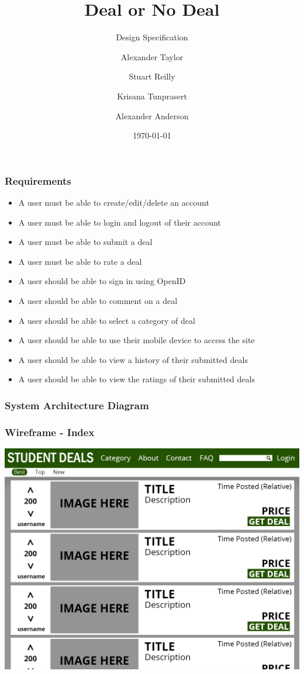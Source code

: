 \documentclass{beamer}
\title{Deal or No Deal}
\subtitle{Design Specification}
\author{Alexander Taylor \and Stuart Reilly \and Krisana Tunprasert \and Alexander Anderson}
\date{\today}
\begin{document}
\frame{\titlepage}

\begin{frame}
	\frametitle{Requirements}
	\begin{itemize}
		\item A user must be able to create/edit/delete an account
		\item A user must be able to login and logout of their account
		\item A user must be able to submit a deal
		\item A user must be able to rate a deal
		\item A user should be able to sign in using OpenID
		\item A user should be able to comment on a deal
		\item A user should be able to select a category of deal
		\item A user should be able to use their mobile device to access the site
		\item A user should be able to view a history of their submitted deals
		\item A user should be able to view the ratings of their submitted deals
	\end{itemize}
\end{frame}

\begin{frame}
	\frametitle{System Architecture Diagram}
	\resizebox{\textwidth}{!}{}
\end{frame}

\begin{frame}
	\frametitle{Wireframe - Index}
	\includegraphics[width=\textwidth,height=\textheight,keepaspectratio]{mockups/index}
\end{frame}
\end{document}

